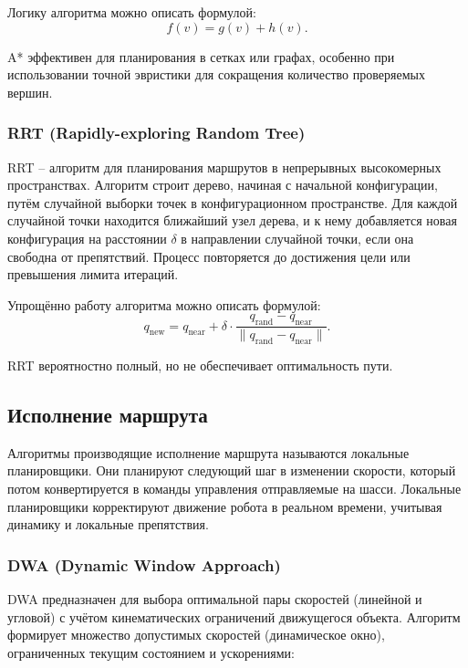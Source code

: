 {Логику алгоритма можно описать формулой:
\begin{equation}
f(v) = g(v) + h(v).
\end{equation}

A* эффективен для планирования в сетках или графах,
особенно при использовании точной эвристики для сокращения количество проверяемых вершин.

\subsubsection{RRT (Rapidly-exploring Random Tree)}
RRT -- алгоритм для планирования маршрутов в непрерывных высокомерных
пространствах. Алгоритм строит дерево, начиная с начальной конфигурации, путём
случайной выборки точек в конфигурационном пространстве. Для каждой случайной
точки находится ближайший узел дерева, и к нему добавляется новая конфигурация
на расстоянии $\delta$ в направлении случайной точки, если она свободна от
препятствий. Процесс повторяется до достижения цели или превышения лимита
итераций.

Упрощённо работу алгоритма можно описать формулой:
\begin{equation}
q_{\text{new}} = q_{\text{near}} + \delta \cdot \frac{q_{\text{rand}} - q_{\text{near}}}{\| q_{\text{rand}} - q_{\text{near}} \|}.
\end{equation}

RRT вероятностно полный, но не обеспечивает оптимальность пути.

\subsection{Исполнение маршрута}
Алгоритмы производящие исполнение маршрута называются локальные планировщики.
Они планируют следующий шаг в изменении скорости, который потом конвертируется в
команды управления отправляемые на шасси.
Локальные планировщики корректируют движение робота в реальном времени, учитывая
динамику и локальные препятствия.

\subsubsection{DWA (Dynamic Window Approach)}
DWA предназначен для выбора оптимальной пары скоростей (линейной и угловой) с
учётом кинематических ограничений движущегося объекта. Алгоритм формирует
множество допустимых скоростей (динамическое окно), ограниченных текущим
состоянием и ускорениями:

}
